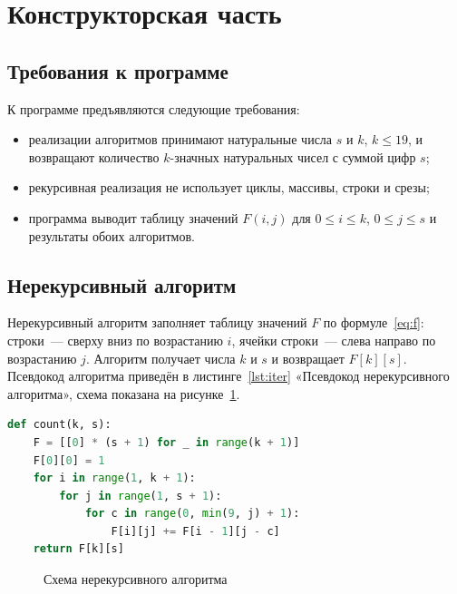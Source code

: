 \clearpage
\section{Конструкторская часть}

\subsection{Требования к программе}

К программе предъявляются следующие требования:
\begin{itemize}
    \item реализации алгоритмов принимают натуральные числа $s$ и $k$, \mbox{$k\le19$},
    и возвращают количество $k$-значных натуральных чисел с суммой цифр $s$;
    \item рекурсивная реализация не использует циклы, массивы, строки и срезы;
    \item программа выводит таблицу значений $F(i,j)$ для \mbox{$0\le i\le k$},
    \mbox{$0\le j\le s$} и результаты обоих алгоритмов.
\end{itemize}

\subsection{Нерекурсивный алгоритм}

Нерекурсивный алгоритм заполняет таблицу значений $F$ по формуле~\eqref{eq:f}:
строки~--- сверху вниз по возрастанию $i$, ячейки строки~--- слева направо
по возрастанию $j$. Алгоритм получает числа $k$ и $s$ и возвращает $F[k][s]$.
Псевдокод алгоритма приведён в листинге~\ref{lst:iter} «Псевдокод
нерекурсивного алгоритма», схема показана на рисунке~\ref{fig:scheme-iter}.

\bigskip
\noindent\begin{minipage}{\dimexpr\linewidth-0.5mm\relax}
\begin{lstlisting}[language=Python,caption={Псевдокод нерекурсивного алгоритма},label={lst:iter}]
def count(k, s):
    F = [[0] * (s + 1) for _ in range(k + 1)]
    F[0][0] = 1
    for i in range(1, k + 1):
        for j in range(1, s + 1):
            for c in range(0, min(9, j) + 1):
                F[i][j] += F[i - 1][j - c]
    return F[k][s]
\end{lstlisting}
\end{minipage}
\medskip

\begin{figure}[H]
    \centering
    
    \caption{Схема нерекурсивного алгоритма}
    \label{fig:scheme-iter}
\end{figure}

